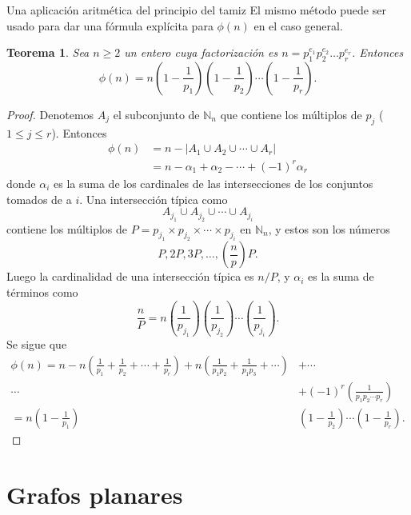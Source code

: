 \documentclass[11pt,spanish,makeidx]{amsbook}
\newtheorem{teorema}{Teorema}[section]
\theoremstyle{definition}
\theoremstyle{remark}
\begin{document}
\begin{section}{Una aplicación aritmética del principio del
tamiz}
El mismo método puede ser usado para dar una fórmula explícita
para $\phi(n)$ en el caso general.

\begin{teorema}\label{tA2.2} Sea $n \ge 2$ un entero cuya factorización
es $n=p_1^{e_1}p_2^{e_2}\ldots p_r^{e_r}$. Entonces
$$
\phi(n)=n\left(1-\frac{1}{p_1}\right)\left(1-\frac{1}{p_2}\right)\cdots\left(1-\frac{1}{p_r}\right).
$$
\end{teorema}
\begin{proof} Denotemos $A_j$ el subconjunto de $\mathbb N_n$
que contiene los múltiplos de $p_j$ ($1\le j \le r$). Entonces
$$
\begin{aligned}
\phi(n) &= n- |A_1 \cup A_2 \cup \cdots \cup A_r| \\
       &= n -\alpha_1+ \alpha_2- \cdots +(-1)^r\alpha_r
\end{aligned}
$$
donde $\alpha_i$ es la suma de los cardinales de las
intersecciones de los conjuntos tomados de a $i$. Una intersección
típica como
$$
A_{j_1}\cup A_{j_2}\cup \cdots \cup A_{j_i}
$$
contiene los múltiplos de $P= p_{j_1}\times p_{j_2}\times \cdots
\times p_{j_i}$ en $\mathbb N_n$, y estos son los números
$$
P,2P,3P,\ldots,\left(\frac{n}{p}\right)P.
$$
Luego la cardinalidad de una intersección típica es $n/P$, y
$\alpha_i$ es la suma de términos como
$$
\frac{n}{P}=
n\left(\frac{1}{p_{j_1}}\right)\left(\frac{1}{p_{j_2}}\right)\cdots
\left(\frac{1}{p_{j_i}}\right).
$$
Se sigue que
$$
\begin{aligned} \phi(n) = n - n\left(\frac{1}{p_1} + \frac{1}{p_2} +
\cdots +\frac{1}{p_r}\right) +n\left(\frac{1}{p_1p_2}
+ \frac{1}{p_1p_3}+\cdots\right) &+ \cdots \\
\cdots &+ (-1)^r \left(\frac{1}{p_1p_2 \cdots p_r}\right) \\
=n\left(1-\frac{1}{p_1}\right)&\left(1-\frac{1}{p_2}\right)\cdots\left(1-\frac{1}{p_r}\right).
\end{aligned}
$$
\end{proof}

\end{section}

\appendix
\setcounter{chapter}{3}
\renewcommand{\thechapter}{\Alph{chapter}}
\chapter{Grafos planares}
\end{document}
